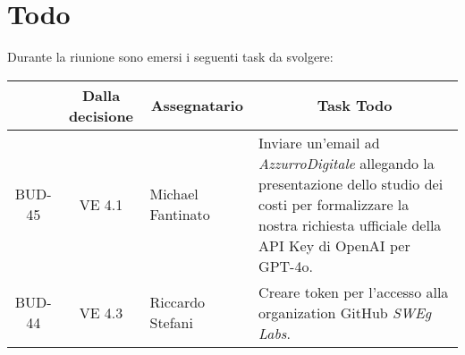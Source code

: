 

\section{Todo}

Durante la riunione sono emersi i seguenti task da svolgere:

\vspace{0.5cm}

\begin{table}[htbp]
\centering
{}
\begin{tabular}{|c|c|p{}|p{}|}
    \hline
    \rowcolor[gray]{0.75}
    \multicolumn{1}{|c|}{\textbf{Codice}} & \multicolumn{1}{|c|}{\textbf{Dalla decisione}} & \multicolumn{1}{|c|}{\textbf{Assegnatario}} & \multicolumn{1}{|c|}{\textbf{Task Todo}} \\
    \hline
    BUD-45 & VE 4.1 & Michael Fantinato & Inviare un'email ad \emph{AzzurroDigitale} allegando la presentazione dello studio dei costi per formalizzare la nostra richiesta
    ufficiale della API Key di OpenAI per GPT-4o. \\
    \hline
    BUD-44 & VE 4.3 & Riccardo Stefani & Creare token per l'accesso alla organization GitHub \emph{SWEg Labs}. \\
    \hline
\end{tabular}
\end{table}

